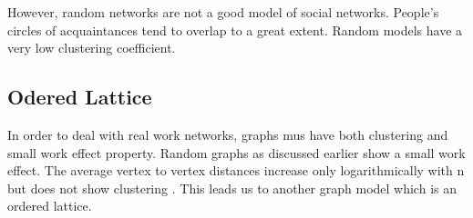 %
%
%
However,  random  networks  are  not  a  good  model  of  social  networks.  People’s  circles  of  
acquaintances  tend  to  overlap  to  a  great  extent. Random models have a very low clustering coefficient.
\subsection{Odered Lattice}
In order to deal with real work networks, graphs mus have both clustering and small work effect property. Random graphs as discussed earlier show a small work effect. The average vertex to vertex distances increase only logarithmically with n but does not show clustering \citep{newman2000models}. This leads us to another graph model which is an ordered lattice.

